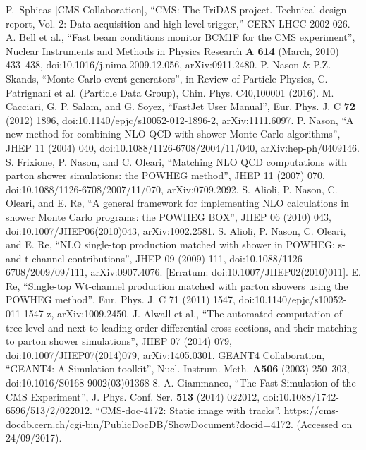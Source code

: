 \begin{thebibliography}{9}
  P.~Sphicas [CMS Collaboration],
  ``CMS: The TriDAS project. Technical design report, Vol. 2: Data acquisition and high-level trigger,''
  CERN-LHCC-2002-026.
 A. Bell et al., “Fast beam conditions monitor BCM1F for the CMS experiment”, Nuclear Instruments and Methods in Physics Research \textbf{A 614} (March, 2010) 433–438, doi:10.1016/j.nima.2009.12.056, arXiv:0911.2480.
 P. Nason \& P.Z. Skands, ``Monte Carlo event generators'', in Review of Particle Physics, C. Patrignani et al. (Particle Data Group), Chin. Phys. C40,100001 (2016).
M. Cacciari, G. P. Salam, and G. Soyez, “FastJet User Manual”, Eur. Phys. J. C \textbf{72} (2012) 1896, doi:10.1140/epjc/s10052-012-1896-2, arXiv:1111.6097.
P. Nason, “A new method for combining NLO QCD with shower Monte Carlo algorithms”, JHEP 11 (2004) 040, doi:10.1088/1126-6708/2004/11/040, arXiv:hep-ph/0409146.
S. Frixione, P. Nason, and C. Oleari, “Matching NLO QCD computations with parton shower simulations: the POWHEG method”, JHEP 11 (2007) 070, doi:10.1088/1126-6708/2007/11/070, arXiv:0709.2092.
S. Alioli, P. Nason, C. Oleari, and E. Re, “A general framework for implementing NLO calculations in shower Monte Carlo programs: the POWHEG BOX”, JHEP 06 (2010) 043, doi:10.1007/JHEP06(2010)043, arXiv:1002.2581.
S. Alioli, P. Nason, C. Oleari, and E. Re, “NLO single-top production matched with shower in POWHEG: s- and t-channel contributions”, JHEP 09 (2009) 111, doi:10.1088/1126-6708/2009/09/111, arXiv:0907.4076. [Erratum: doi:10.1007/JHEP02(2010)011].
E. Re, “Single-top Wt-channel production matched with parton showers using the POWHEG method”, Eur. Phys. J. C 71 (2011) 1547, doi:10.1140/epjc/s10052-011-1547-z, arXiv:1009.2450.
J. Alwall et al., “The automated computation of tree-level and next-to-leading order differential cross sections, and their matching to parton shower simulations”, JHEP 07 (2014) 079, doi:10.1007/JHEP07(2014)079, arXiv:1405.0301.
GEANT4 Collaboration, “GEANT4: A Simulation toolkit”, Nucl. Instrum. Meth. \textbf{A506} (2003) 250–303, doi:10.1016/S0168-9002(03)01368-8.
A. Giammanco, “The Fast Simulation of the CMS Experiment”, J. Phys. Conf. Ser. \textbf{513} (2014) 022012, doi:10.1088/1742-6596/513/2/022012.
“CMS-doc-4172: Static image with tracks”. https://cms-docdb.cern.ch/cgi-bin/PublicDocDB/ShowDocument?docid=4172. (Accessed on 24/09/2017).

\end{thebibliography}
